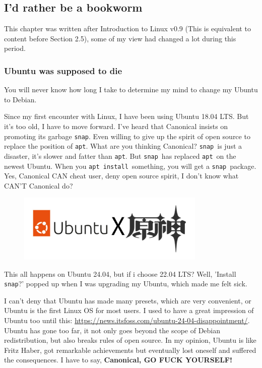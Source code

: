 \documentclass[12pt]{ctexart}
\newenvironment{mdquote}
{%
  \par\noindent
  \begin{list}{}{%
      \setlength{\leftmargin}{1em}%
      \setlength{\rightmargin}{0pt}%
      \setlength{\itemindent}{0pt}%
      \setlength{\listparindent}{\parindent}%
      \setlength{\topsep}{0.5\baselineskip}%
  }
  \item[\textbf{>}\ ]\itshape
}
{\end{list}\par}
\begin{document}
\newpage
\subsection{\textbf{I'd rather be a bookworm}}

\begin{mdquote}
This chapter was written after Introduction to Linux v0.9 (This is
equivalent to content before Section 2.5), some of my view had changed a
lot during this period.
\end{mdquote}

\subsubsection{\textbf{Ubuntu was supposed to die}}

You will never know how long I take to determine my mind to change my
Ubuntu to Debian.

Since my first encounter with Linux, I have been using Ubuntu 18.04 LTS.
But it's too old, I have to move forward.
I've heard that Canonical insists on promoting its
garbage \texttt{snap}. Even willing to give up the spirit of open source
to replace the position of \texttt{apt}. What are you thinking
Canonical? \texttt{snap}\ is just a disaster, it's slower
and fatter than \texttt{apt}. But \texttt{snap}\ has replaced
\texttt{apt}\ on the newest Ubuntu. When you \texttt{apt\ install}\
something, you will get a \texttt{snap}\ package. Yes, Canonical CAN
cheat user, deny open source spirit, I don't know what
CAN'T Canonical do?

\begin{figure}[H]
    \centering
    \includegraphics[width=0.8\textwidth,keepaspectratio]{assets/Linux/2.7 I'd rather be a bookworm/1.png}
\end{figure}

This all happens on Ubuntu 24.04, but if i choose 22.04 LTS? Well,
'Install \texttt{snap}?' popped up when
I was upgrading my Ubuntu, which made me felt sick.

I can't deny that Ubuntu has made many presets, which
are very convenient, or Ubuntu is the first Linux OS for most users. I
used to have a great impression of Ubuntu too until this:
\url{https://news.itsfoss.com/ubuntu-24-04-disappointment/}. Ubuntu has
gone too far, it not only goes beyond the scope of Debian
redistribution, but also breaks rules of open source. In my opinion,
Ubuntu is like Fritz Haber, got remarkable achievements but eventually
lost oneself and suffered the consequences. I have to say,
\textbf{Canonical, GO FUCK YOURSELF!}
\end{document}
